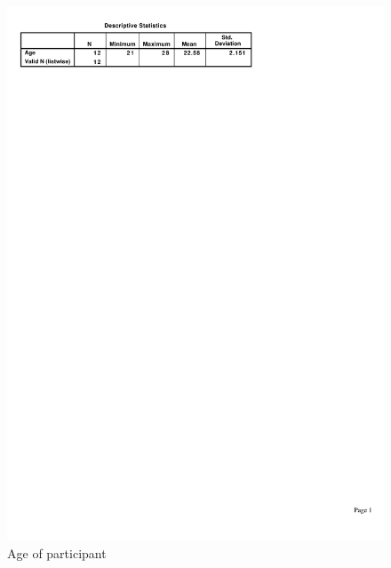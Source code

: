 \documentclass[a4paper, 12pt]{report}
\begin{document}
\begin{figure}[ht]
\centerline{\includegraphics{figures/Age.pdf}}
\caption{Age of participant}
\label{fig:partic_age}
\end{figure}
\end{document}
